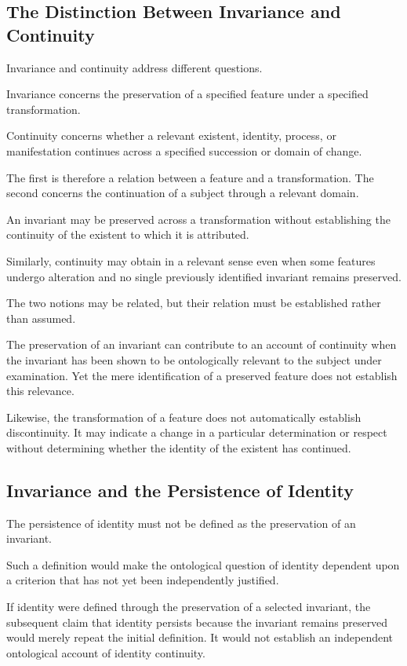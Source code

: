 \subsection{The Distinction Between Invariance and Continuity}

Invariance and continuity address different questions.

Invariance concerns the preservation of a specified
feature under a specified transformation.

Continuity concerns whether a relevant existent,
identity, process, or manifestation continues across
a specified succession or domain of change.

The first is therefore a relation between a feature
and a transformation. The second concerns the continuation
of a subject through a relevant domain.

An invariant may be preserved across a transformation
without establishing the continuity of the existent
to which it is attributed.

Similarly, continuity may obtain in a relevant sense
even when some features undergo alteration and no
single previously identified invariant remains preserved.

The two notions may be related, but their relation
must be established rather than assumed.

The preservation of an invariant can contribute to
an account of continuity when the invariant has been
shown to be ontologically relevant to the subject
under examination. Yet the mere identification of
a preserved feature does not establish this relevance.

Likewise, the transformation of a feature does not
automatically establish discontinuity. It may indicate
a change in a particular determination or respect
without determining whether the identity of the
existent has continued.

\subsection{Invariance and the Persistence of Identity}

The persistence of identity must not be defined as
the preservation of an invariant.

Such a definition would make the ontological question
of identity dependent upon a criterion that has not
yet been independently justified.

If identity were defined through the preservation
of a selected invariant, the subsequent claim that
identity persists because the invariant remains
preserved would merely repeat the initial definition.
It would not establish an independent ontological
account of identity continuity.

